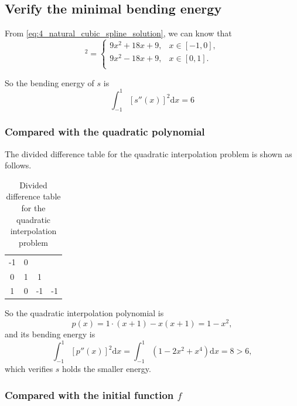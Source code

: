 \documentclass[a4paper]{article}
\begin{document}
\subsection{Verify the minimal bending energy}

From \cref{eq:4_natural_cubic_spline_solution}, we can know that 
\begin{equation}
  [s''(x)]^2 = \begin{cases}
    9x^2 + 18x + 9,& x \in [-1, 0], \\
    9x^2 - 18x + 9,& x \in [0, 1]. \\
  \end{cases}
  \label{eq:4_minimal_bending_energy}
\end{equation}

So the bending energy of $s$ is 
\begin{equation}
  \int_{-1}^{1} [s''(x)]^2 \mathrm{d}x = 6
  \label{eq:4_bending_energy_s}
\end{equation}

\subsubsection{Compared with the quadratic polynomial}

The divided difference table for the quadratic interpolation problem is shown as follows.
\begin{table}[htbp]
  \centering
  \begin{tabular}{c|ccc}
    -1 & 0 &    &    \\
    0  & 1 & 1  &    \\
    1  & 0 & -1 & -1 \\
  \end{tabular}
  \caption{Divided difference table for the quadratic interpolation problem}
  \label{tb:4_divided_difference_quadratic}
\end{table}
So the quadratic interpolation polynomial is
\begin{equation}
  p(x) = 1 \cdot (x + 1) - x(x + 1) = 1 - x^2,
  \label{eq:4_quadratic_polynomial}
\end{equation}
and its bending energy is 
\begin{equation}
  \int_{-1}^{1} [p''(x)]^2 \mathrm{d}x = \int_{-1}^1 (1 - 2x^2 + x^4) \mathrm{d}x = 8 > 6,
\end{equation}
which verifies $s$ holds the smaller energy.

\subsubsection{Compared with the initial function $f$}
\end{document}
